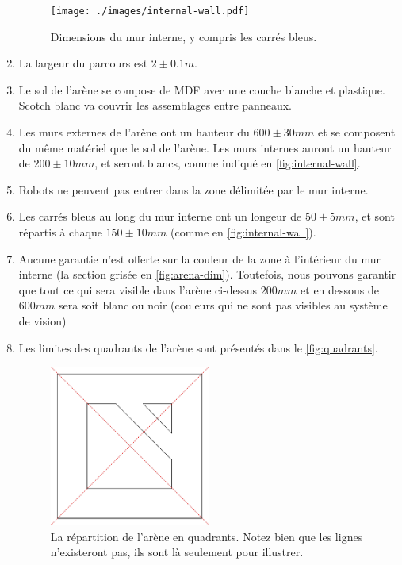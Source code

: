 \begin{enumerate}
\begin{figure}
  \texttt{[image: ./images/internal-wall.pdf]}
  \caption{\label{fig:internal-wall}Dimensions du mur interne, y compris les carrés bleus.}
\end{figure}

\item La largeur du parcours est $2\pm0.1m$.
\item Le sol de l'arène se compose de MDF avec une couche blanche et plastique.
 Scotch blanc va couvrir les assemblages entre panneaux.
\item Les murs externes de l'arène ont un hauteur du $600\pm30mm$ et se composent du même matériel que le sol de l'arène.
 Les murs internes auront un hauteur de $200\pm10mm$, et seront blancs, comme indiqué en \autoref{fig:internal-wall}.
\item Robots ne peuvent pas entrer dans la zone délimitée par le mur interne.
\item Les carrés bleus au long du mur interne ont un longeur de $50\pm5mm$, et sont répartis à chaque $150\pm10mm$ (comme en \autoref{fig:internal-wall}).
\item Aucune garantie n'est offerte sur la couleur de la zone à l'intérieur du mur interne (la section grisée en \autoref{fig:arena-dim}).
 Toutefois, nous pouvons garantir que tout ce qui sera visible dans l'arène ci-dessus $200mm$ et en dessous de $600mm$ sera soit blanc ou noir (couleurs qui ne sont pas visibles au système de vision)
\item Les limites des quadrants de l'arène sont présentés dans le \autoref{fig:quadrants}.

\begin{figure}
\begin{center}
  \includegraphics[keepaspectratio, clip, width=0.5\textwidth]{./images/quadrants.pdf}
  \caption{\label{fig:quadrants}La répartition de l'arène en quadrants.
           Notez bien que les lignes n'existeront pas, ils sont là seulement pour illustrer.}
\end{center}
\end{figure}


\end{enumerate}
